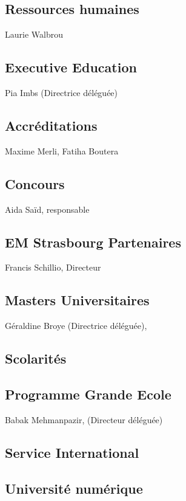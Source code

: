 \documentclass{book}
\begin{document}
\subsection{Ressources humaines}
Laurie Walbrou

\subsection{Executive Education }
Pia Imbs (Directrice déléguée)

\subsection{Accréditations}
Maxime Merli, Fatiha Boutera

\subsection{Concours }
Aida Saïd, responsable

\subsection{EM Strasbourg Partenaires }
Francis Schillio, Directeur 

\subsection{Masters Universitaires}
Géraldine Broye (Directrice déléguée),

 
\subsection{Scolarités}

\subsection{Programme Grande Ecole}
Babak Mehmanpazir, (Directeur déléguée)

\subsection{Service International}

\subsection{Université numérique}



\appendix
%
\printindex
\end{document}
